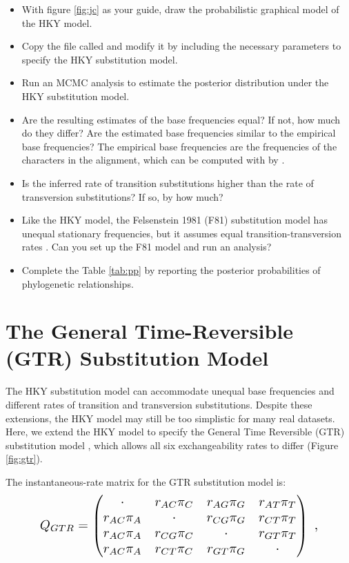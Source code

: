 \begin{itemize}
\item With figure \ref{fig:jc} as your guide, draw the probabilistic graphical model of the HKY model.
\item Copy the file called   and modify it by including the necessary parameters to specify the HKY substitution model.
\item Run an MCMC analysis to estimate the posterior distribution under the HKY substitution model.
\item Are the resulting estimates of the base frequencies equal? 
	If not, how much do they differ? 
	Are the estimated base frequencies similar to the empirical base frequencies? 
	The empirical base frequencies are the frequencies of the characters in the alignment, which can be computed with \RevBayes by .
\item Is the inferred rate of transition substitutions higher than the rate of transversion substitutions? If so, by how much?
\item Like the HKY model, the Felsenstein 1981 (F81) substitution model has unequal stationary frequencies, but it assumes equal transition-transversion rates \citep{Felsenstein1981}.
	Can you set up the F81 model and run an analysis?
\item Complete the Table \ref{tab:pp} by reporting the posterior probabilities of phylogenetic relationships.
\end{itemize}






\section{The General Time-Reversible (GTR) Substitution Model}

The HKY substitution model can accommodate unequal base frequencies and different rates of transition and transversion substitutions.
Despite these extensions, the HKY model may still be too simplistic for many real datasets.
Here, we extend the HKY model to specify the General Time Reversible (GTR) substitution model \citep{Tavare1986}, which allows all six exchangeability rates to differ (Figure \ref{fig:gtr}).

The instantaneous-rate matrix for the GTR substitution model is:
\begin{equation*}
\resizebox{4in}{!}{%
$Q_{GTR} = \begin{pmatrix}
{\cdot}	   & {r_{AC}\pi_C} & {r_{AG}\pi_G} & {r_{AT}\pi_T} \\
{r_{AC}\pi_A} & {\cdot}       & {r_{CG}\pi_G} & {r_{CT}\pi_T} \\
{r_{AC}\pi_A} & {r_{CG}\pi_C} & {\cdot}       & {r_{GT}\pi_T} \\
{r_{AC}\pi_A} & {r_{CT}\pi_C} & {r_{GT}\pi_G} & {\cdot}       \\
\end{pmatrix} \mbox{  ,} $}
\end{equation*}

